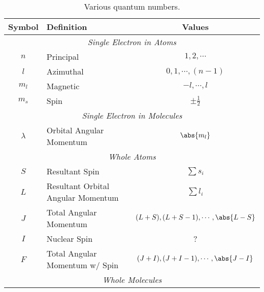 \documentclass[11pt, twoside, fleqn]{report}
\begin{document}
    \begin{table}[H]
        \centering
        \caption{Various quantum numbers.}
        \label{t:quantum_numbers}
        \begin{tabular}{clc}
            \toprule
            Symbol    & Definition                            & Values                                      \\
            \midrule
            \multicolumn{3}{c}{\textit{Single Electron in Atoms}}                                           \\
            \cmidrule(lr){1-3}
            $n$       & Principal                             & $1, 2, \dotsb$                              \\
            $l$       & Azimuthal                             & $0, 1, \dotsb, (n - 1)$                     \\
            $m_l$   & Magnetic                              & $-l, \dotsb, l$                             \\
            $m_s$   & Spin                                  & $\pm \frac{1}{2}$                           \\
            \multicolumn{3}{c}{\textit{Single Electron in Molecules}}                                       \\
            \cmidrule(lr){1-3}
            $\lambda$ & Orbital Angular Momentum              & $\abs{m_l}$                               \\
            \multicolumn{3}{c}{\textit{Whole Atoms}}                                                        \\
            \cmidrule(lr){1-3}
            $S$       & Resultant Spin                        & $\sum s_i$                                \\
            $L$       & Resultant Orbital Angular Momentum    & $\sum l_i$                                \\
            $J$       & Total Angular Momentum                & $(L + S), (L + S - 1), \dotsb, \abs{L - S}$ \\
            $I$       & Nuclear Spin                          & ?                                           \\
            $F$       & Total Angular Momentum w/ Spin        & $(J + I), (J + I - 1), \dotsb, \abs{J - I}$ \\
            \multicolumn{3}{c}{\textit{Whole Molecules}}                                                    \\

\end{tabular}
\end{table}
\end{document}
